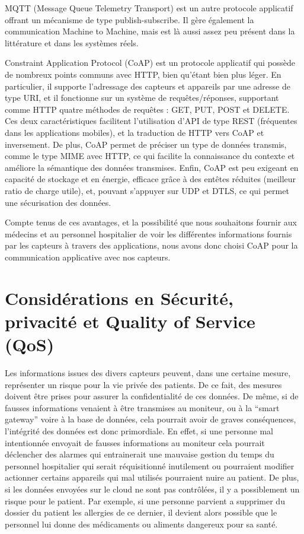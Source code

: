 \documentclass{article}
\begin{document}
MQTT (Message Queue Telemetry Transport) est un autre protocole applicatif offrant un mécanisme de type publish-subscribe. Il gère également la communication Machine to Machine, mais est là aussi assez peu présent dans la littérature et dans les systèmes réels.

Constraint Application Protocol (CoAP) est un protocole applicatif qui possède de nombreux points communs avec HTTP, bien qu’étant bien plus léger. En particulier, il supporte l’adressage des capteurs et appareils par une adresse de type URI, et il fonctionne sur un système de requêtes/réponses, supportant comme HTTP quatre méthodes de requêtes : GET, PUT, POST et DELETE. Ces deux caractéristiques facilitent l’utilisation d’API de type REST (fréquentes dans les applications mobiles), et la traduction de HTTP vers CoAP et inversement. De plus, CoAP permet de préciser un type de données transmis, comme le type MIME avec HTTP, ce qui facilite la connaissance du contexte et améliore la sémantique des données transmises. Enfin, CoAP est peu exigeant en capacité de stockage et en énergie, efficace grâce à des entêtes réduites (meilleur ratio de charge utile), et, pouvant s’appuyer sur UDP et DTLS, ce qui permet une sécurisation des données.

Compte tenus de ces avantages, et la possibilité que nous souhaitons fournir aux médecins et au personnel hospitalier de voir les différentes informations fournis par les capteurs à travers des applications, nous avons donc choisi CoAP pour la communication applicative avec nos capteurs.

\section {Considérations en Sécurité, privacité et Quality of Service (QoS)}

Les informations issues des divers capteurs peuvent, dans une certaine mesure, représenter un risque pour la vie privée des patients. De ce fait, des mesures doivent être prises pour assurer la confidentialité de ces données. De même, si de fausses informations venaient à être transmises au moniteur, ou à la “smart gateway” voire à la base de données, cela pourrait avoir de graves conséquences, l'intégrité des données est donc primordiale. En effet, si une personne mal intentionnée envoyait de fausses informations au moniteur cela pourrait déclencher des alarmes qui entrainerait une mauvaise gestion du temps du personnel hospitalier qui serait réquisitionné inutilement ou pourraient modifier actionner certains appareils qui mal utilisés pourraient nuire au patient. De plus, si les données envoyées sur le cloud ne sont pas contrôlées, il y a possiblement un risque pour le patient. Par exemple, si une personne parvient a supprimer du dossier du patient les allergies de ce dernier, il devient alors possible que le personnel lui donne des médicaments ou aliments dangereux pour sa santé.
\end{document}
